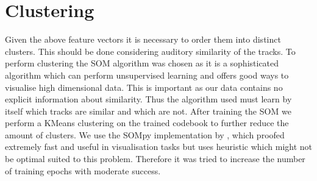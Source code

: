 \documentclass[cic,tc,english]{iiufrgs}
\begin{document}
\begin{table}
\center
\caption{Feature Vectors}
\label{tab:feature_vec}
\end{table}



\section{Clustering}
Given the above feature vectors it is necessary to order them into distinct clusters. This should be done considering auditory similarity of the tracks. To perform clustering the SOM algorithm was chosen as it is a sophisticated algorithm which can perform unsupervised learning and offers good ways to visualise high dimensional data. This is important as our data contains no explicit information about similarity. Thus the algorithm used must learn by itself which tracks are similar and which are not. After training the SOM we perform a KMeans clustering on the trained codebook to further reduce the amount of clusters. We use the SOMpy implementation by \cite{sompy}, which proofed extremely fast and useful in visualisation tasks but uses heuristic which might not be optimal suited to this problem. Therefore it was tried to increase the number of training epochs with moderate success.
\end{document}
